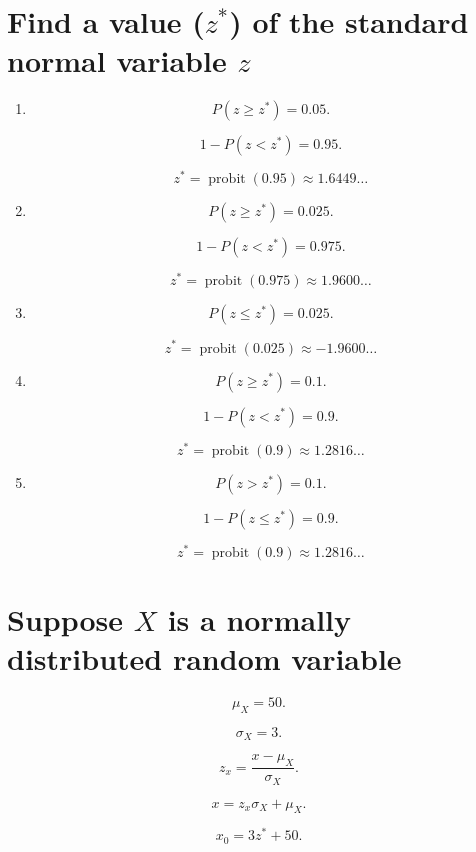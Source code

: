 \documentclass[12pt]{article}
\DeclareMathOperator{\probit}{probit}
\begin{document}
\section{Find a value ($z^*$) of the standard normal variable $z$}
\begin{enumerate}
\item
\[P(z\geq z^*)=0.05.\]

\[1-P(z<z^*)=0.95.\]

\[z^*=\probit(0.95)\approx 1.6449\dots\]
\item
\[P(z\geq z^*)=0.025.\]

\[1-P(z<z^*)=0.975.\]

\[z^*=\probit(0.975)\approx 1.9600\dots\]
\item
\[P(z\leq z^*)=0.025.\]

\[z^*=\probit(0.025)\approx -1.9600\dots\]
\item
\[P(z\geq z^*)=0.1.\]

\[1-P(z<z^*)=0.9.\]

\[z^*=\probit(0.9)\approx 1.2816\dots\]
\item
\[P(z>z^*)=0.1.\]

\[1-P(z\leq z^*)=0.9.\]

\[z^*=\probit(0.9)\approx 1.2816\dots\]
\end{enumerate}
\section{Suppose $X$ is a normally distributed random variable}
\[\mu_X=50.\]

\[\sigma_X=3.\]

\[z_x=\frac{x-\mu_X}{\sigma_X}.\]

\[x=z_x\sigma_X+\mu_X.\]

\[x_0=3z^*+50.\]
\end{document}

